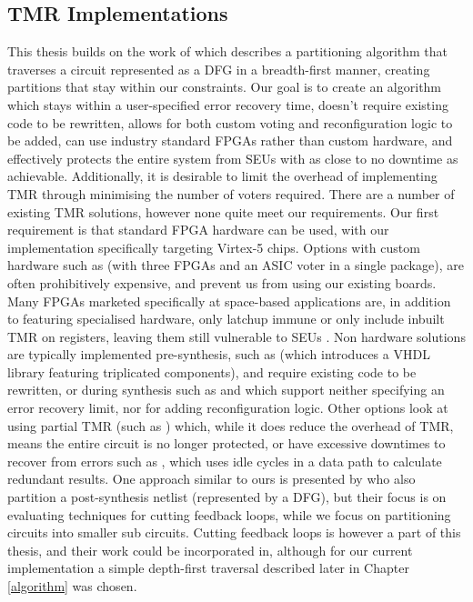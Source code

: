 \documentclass[12pt,final,oneside]{dwThesis} %
\begin{document}
   \subsection{\gls{TMR}
      Implementations} This thesis builds on the
   work of\cite{DiesselChange} which describes a partitioning algorithm that
   traverses a circuit represented as a \gls{DFG} in a breadth-first manner,
   creating partitions that stay within our constraints.  Our goal is to create an
   algorithm which stays within a user-specified error recovery time, doesn't
   require existing code to be rewritten, allows for both custom voting and
   reconfiguration logic to be added, can use industry standard \glspl{FPGA}
   rather than custom hardware, and effectively protects the entire system from
   \glspl{SEU} with as close to no downtime as achievable.  Additionally, it is
   desirable to limit the overhead of implementing \gls{TMR} through minimising
   the number of voters required.  There are a number of existing \gls{TMR}
   solutions, however none quite meet our requirements.  Our first requirement is
   that standard \gls{FPGA} hardware can be used, with our implementation
   specifically targeting Virtex-5 chips. Options with custom hardware such as
   \cite{VFPGATMR} (with three \glspl{FPGA} and an \gls{ASIC} voter in a single
   package), are often prohibitively expensive, and prevent us from using our
   existing boards.  Many \glspl{FPGA} marketed specifically at space-based
   applications are, in addition to featuring specialised hardware, only
   latchup immune or only include inbuilt \gls{TMR} on registers,
   leaving them still vulnerable to \glspl{SEU} \cite{FPGAReview}.  Non hardware
   solutions are typically implemented pre-synthesis, such as \cite{ftmr} (which
   introduces a \gls{VHDL} library featuring triplicated components), and require
   existing code to be rewritten, or during synthesis such as \cite{synplify} and
   \cite{tmrtool} which support neither specifying an error recovery limit, nor
   for adding reconfiguration logic.  Other options look at using partial
   \gls{TMR} (such as \cite{partialTMR}) which, while it does reduce the overhead
   of \gls{TMR}, means the entire circuit is no longer protected, or have
   excessive downtimes to recover from errors such as \cite{VTMR}, which uses idle
   cycles in a data path to calculate redundant results.  One approach similar to
   ours is presented by \cite{PostSynth} who also partition a post-synthesis
   netlist (represented by a \gls{DFG}), but their focus is on evaluating
   techniques for cutting feedback loops, while we focus on partitioning circuits
   into smaller sub circuits. Cutting feedback loops is however a part of this
   thesis, and their work could be incorporated in, although for our current
   implementation a simple depth-first traversal described later in Chapter \ref{algorithm} was chosen.
\end{document}
